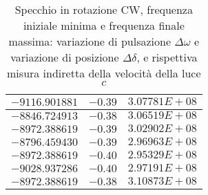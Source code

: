 \documentclass{article} %
\begin{document}
\begin{table}
\begin{tabular}{||c|c|c||}
            $-9116.901881$ & $-0.39$ & $3.07781E+08$ \\\hline
            $-8846.724913$ & $-0.38$ & $3.06519E+08$ \\\hline
            $-8972.388619$ & $-0.39$ & $3.02902E+08$ \\\hline
            $-8796.459430$ & $-0.39$ & $2.96963E+08$ \\\hline
            $-8972.388619$ & $-0.40$ & $2.95329E+08$ \\\hline
            $-9028.937286$ & $-0.40$ & $2.97191E+08$ \\\hline
            $-8972.388619$ & $-0.38$ & $3.10873E+08$ \\\hline
        \end{tabular}
        \caption{Specchio in rotazione CW, frequenza iniziale minima e frequenza finale massima: variazione di pulsazione $\Delta\omega$ e variazione di posizione $\Delta\delta$, e rispettiva misura indiretta della velocità della luce $c$}
        \label{CW_min_max}
    \end{table}
\end{document}
